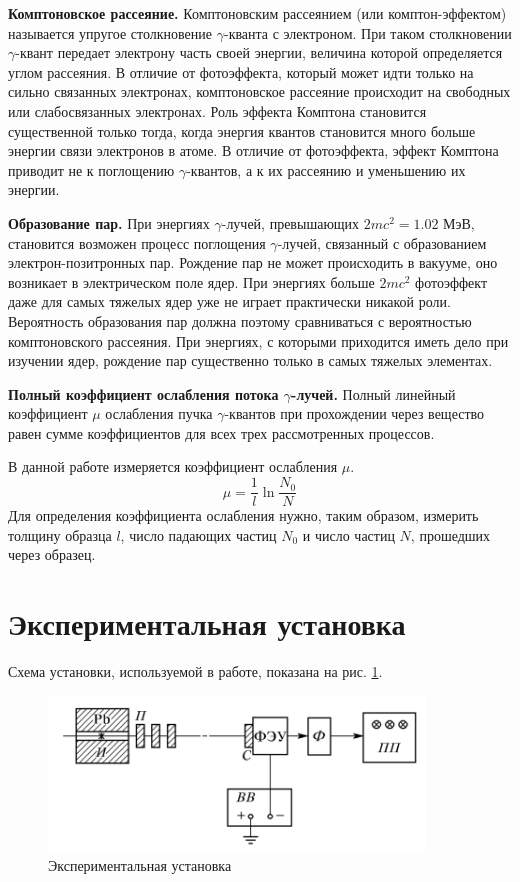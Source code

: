 \documentclass[12pt,a4paper]{article}
\begin{document}
	
	
	\textbf{Комптоновское рассеяние.} Комптоновским рассеянием (или комптон-эффектом) называется упругое столкновение $\gamma$-кванта с электроном. При таком столкновении $\gamma$-квант передает электрону часть своей энергии, величина которой определяется углом рассеяния. В отличие от фотоэффекта, который может идти только на сильно связанных электронах, комптоновское рассеяние происходит на свободных или слабосвязанных электронах. Роль эффекта Комптона становится существенной только тогда, когда энергия квантов становится много больше энергии связи электронов в атоме. В отличие от фотоэффекта, эффект Комптона приводит не к поглощению $\gamma$-квантов, а к их рассеянию и уменьшению их энергии.
	
	
	\textbf{Образование пар.} При энергиях $\gamma$-лучей, превышающих $2mc^2 = 1.02$ МэВ, становится возможен процесс поглощения $\gamma$-лучей, связанный с образованием электрон-позитронных пар. Рождение пар не может происходить в вакууме, оно возникает в электрическом поле ядер. При энергиях больше $2mc^2$ фотоэффект даже для самых тяжелых ядер уже не играет практически никакой роли. Вероятность образования пар должна поэтому сравниваться с вероятностью комптоновского рассеяния. При энергиях, с которыми приходится иметь дело при изучении ядер, рождение пар существенно только в самых тяжелых элементах.
	
	
	\textbf{Полный коэффициент ослабления потока $\gamma$-лучей.} Полный линейный коэффициент $\mu$ ослабления пучка $\gamma$-квантов при прохождении через вещество равен сумме коэффициентов для всех трех рассмотренных процессов.
	
	
	
	В данной работе измеряется коэффициент ослабления $\mu$.
	\begin{equation}
		\mu = \frac{1}{l} \ln \frac{N_0}{N}
	\end{equation}
	Для определения коэффициента ослабления нужно, таким образом, измерить толщину образца $l$, число падающих частиц $N_0$ и число частиц $N$, прошедших через образец.
	
 
	\section*{Экспериментальная установка}
	
	Схема установки, используемой в работе, показана на рис. \ref{WeakCoeff_Scheme}.
	\begin{figure}[h!]
		\centering
		\includegraphics[width=10cm]{res/scheme.png}
		\caption{Экспериментальная установка}
		\label{WeakCoeff_Scheme}
	\end{figure}
\end{document}
